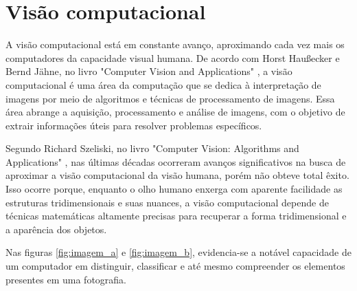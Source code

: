 \section{Visão computacional}

A visão computacional está em constante avanço, aproximando cada vez mais os computadores da capacidade visual humana. De acordo com Horst Haußecker e Bernd Jähne, no livro "Computer Vision and Applications" \space\cite{comp_vision_and_applications}, a visão computacional é uma área da computação que se dedica à interpretação de imagens por meio de algoritmos e técnicas de processamento de imagens. Essa área abrange a aquisição, processamento e análise de imagens, com o objetivo de extrair informações úteis para resolver problemas específicos.

Segundo Richard Szeliski, no livro "Computer Vision: Algorithms and Applications" \space\cite{computer_vision_richard}, nas últimas décadas ocorreram avanços significativos na busca de aproximar a visão computacional da visão humana, porém não obteve total êxito. Isso ocorre porque, enquanto o olho humano enxerga com aparente facilidade as estruturas tridimensionais e suas nuances, a visão computacional depende de técnicas matemáticas altamente precisas para recuperar a forma tridimensional e a aparência dos objetos.

Nas figuras \cref{fig:imagem_a} e \cref{fig:imagem_b}, evidencia-se a notável capacidade de um computador em distinguir, classificar e até mesmo compreender os elementos presentes em uma fotografia.

